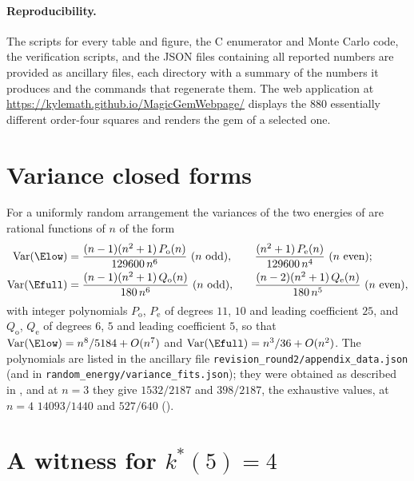 \paragraph{Reproducibility.}
The scripts for every table and figure, the C enumerator and Monte Carlo code, the verification scripts, and the JSON files containing all reported numbers are provided as ancillary files, each directory with a summary of the numbers it produces and the commands that regenerate them.
The web application at \url{https://kylemath.github.io/MagicGemWebpage/} displays the $880$ essentially different order-four squares and renders the gem of a selected one.

\section{Variance closed forms}
\label{sec:app_variance}

For a uniformly random arrangement the variances of the two energies of  are rational
functions of $n$ of the form
\begin{equation}
\begin{aligned}
\Var(\Elow)&=\frac{(n-1)(n^2+1)\,P_{\mathrm o}(n)}{129600\,n^{6}}\ (n\ \text{odd}),&\quad
&\frac{(n^2+1)\,P_{\mathrm e}(n)}{129600\,n^{4}}\ (n\ \text{even});\\
\Var(\Efull)&=\frac{(n-1)(n^2+1)\,Q_{\mathrm o}(n)}{180\,n^{6}}\ (n\ \text{odd}),&\quad
&\frac{(n-2)(n^2+1)\,Q_{\mathrm e}(n)}{180\,n^{5}}\ (n\ \text{even}),
\end{aligned}
\label{eq:var_low}
\end{equation}
with integer polynomials $P_{\mathrm o}$, $P_{\mathrm e}$ of degrees $11$, $10$ and leading coefficient $25$, and
$Q_{\mathrm o}$, $Q_{\mathrm e}$ of degrees $6$, $5$ and leading coefficient $5$, so that $\Var(\Elow)=n^8/5184+O(n^7)$ and
$\Var(\Efull)=n^3/36+O(n^2)$.  The polynomials are listed in the ancillary file \texttt{revision\_round2/appendix\_data.json}
(and in \texttt{random\_energy/variance\_fits.json}); they were obtained as described in , and at $n=3$ they
give $1532/2187$ and $398/2187$, the exhaustive values, at $n=4$ $14093/1440$ and $527/640$ ().

\section{A witness for $k^*(5)=4$}
\label{sec:app_witnesses}

